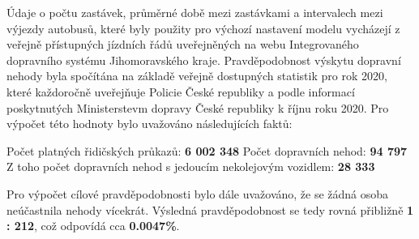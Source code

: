 \documentclass[a4paper]{article}
\begin{document}
            Údaje o počtu zastávek, průměrné době mezi zastávkami a intervalech mezi výjezdy autobusů, které byly použity pro výchozí nastavení modelu vycházejí z veřejně přístupných jízdních řádů uveřejněných na webu Integrovaného dopravního systému Jihomoravského kraje\cite{Jizdni_rad}. 
            Pravděpodobnost výskytu dopravní nehody byla spočítána na základě veřejně dostupných statistik pro rok 2020, které každoročně uveřejňuje Policie České republiky a podle informací poskytnutých Ministerstevm dopravy České republiky k říjnu roku 2020\cite{Accident_statistics}. Pro výpočet této hodnoty bylo uvažováno následujících faktů:
            \begin{outline}
            	\1 Počet platných řidičských průkazů: \textbf{6 002 348}
            	\1 Počet dopravních nehod: \textbf{94 797}
            	\2 Z toho počet dopravních nehod s jedoucím nekolejovým vozidlem: \textbf{28 333}
            \end{outline}
            
            Pro výpočet cílové pravděpodobnosti bylo dále uvažováno, že se žádná osoba neúčastnila nehody vícekrát. Výsledná pravděpodobnost se tedy rovná přibližně \textbf{1 : 212}, což odpovídá cca \textbf{0.0047\%}.
            
\end{document}
